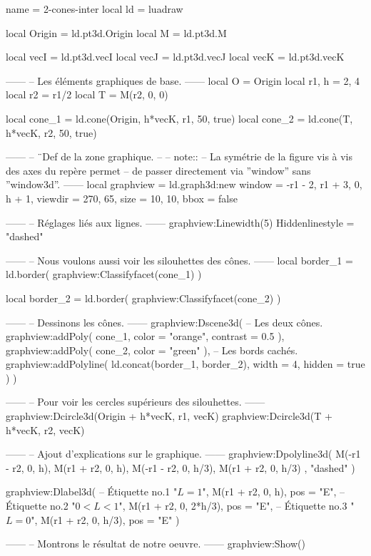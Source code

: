 \documentclass[border = 3pt]{standalone}
\begin{document}
\begin{luadraw*}{name = 2-cones-inter}
local ld = luadraw

local Origin = ld.pt3d.Origin
local M      = ld.pt3d.M

local vecI = ld.pt3d.vecI
local vecJ = ld.pt3d.vecJ
local vecK = ld.pt3d.vecK

------
-- Les éléments graphiques de base.
------
local O     = Origin
local r1, h = 2, 4
local r2    = r1/2
local T     = M(r2, 0, 0)

local cone_1 = ld.cone(Origin, h*vecK, r1, 50, true)
local cone_2 = ld.cone(T, h*vecK, r2, 50, true)

------
-- ¨Def de la zone graphique.
--
-- note::
--     La symétrie de la figure vis à vis des axes du repère permet
--     de passer directement via ''window'' sans ''window3d''.
------
local graphview = ld.graph3d:new{
  window  = {-r1 - 2, r1 + 3, 0, h + 1},
  viewdir = {270, 65},
  size    = {10, 10},
  bbox = false
}

------
-- Réglages liés aux lignes.
------
graphview:Linewidth(5)
Hiddenlinestyle = "dashed"

------
-- Nous voulons aussi voir les silouhettes des cônes.
------
local border_1 = ld.border(
  graphview:Classifyfacet(cone_1)
)

local border_2 = ld.border(
  graphview:Classifyfacet(cone_2)
)

------
-- Dessinons les cônes.
------
graphview:Dscene3d(
-- Les deux cônes.
  graphview:addPoly(
    cone_1,
    {
      color    = "orange",
      contrast = 0.5
    }
  ),
  graphview:addPoly(
    cone_2,
    {
      color = "green"
    }
  ),
-- Les bords cachés.
  graphview:addPolyline(
    ld.concat(border_1, border_2),
    {
      width  = 4,
      hidden = true
    }
  )
)

------
-- Pour voir les cercles supérieurs des silouhettes.
------
graphview:Dcircle3d(Origin + h*vecK, r1, vecK)
graphview:Dcircle3d(T + h*vecK, r2, vecK)

------
-- Ajout d'explications sur le graphique.
------
graphview:Dpolyline3d(
  {
    {M(-r1 - r2,  0,  h), M(r1 + r2,  0,  h)},
    {M(-r1 - r2,  0,  h/3), M(r1 + r2,  0,  h/3)}
  },
  "dashed"
)

graphview:Dlabel3d(
-- Étiquette no.1
  "$L = 1$",
  M(r1 + r2, 0, h),
  {pos = "E"},
-- Étiquette no.2
  "$0 < L <1$",
  M(r1 + r2, 0, 2*h/3),
  {pos = "E"},
-- Étiquette no.3
  "$L = 0$",
  M(r1 + r2, 0, h/3),
  {pos = "E"}
)

------
-- Montrons le résultat de notre oeuvre.
------
graphview:Show()
\end{luadraw*}
\end{document}
